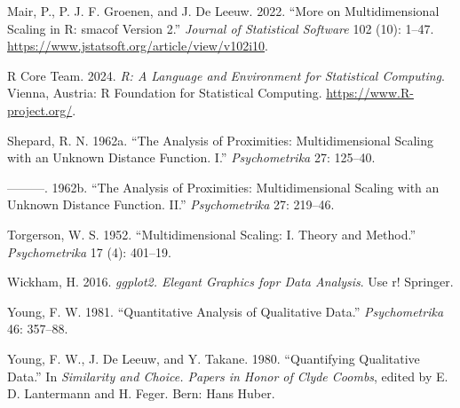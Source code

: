 \documentclass[
  12pt,
  letterpaper,
  DIV=11,
  numbers=noendperiod]{scrartcl}
\newlength{\cslhangindent}
\newenvironment{CSLReferences}[2] %
 {\begin{list}{}{%
  \setlength{\itemindent}{0pt}
  \setlength{\leftmargin}{0pt}
  \setlength{\parsep}{0pt}
  \ifodd #1
   \setlength{\leftmargin}{\cslhangindent}
   \setlength{\itemindent}{-1\cslhangindent}
  \fi
  \setlength{\itemsep}{#2\baselineskip}}}
 {\end{list}}
\theoremstyle{plain}
\theoremstyle{remark}
\begin{document}
\begin{CSLReferences}{1}{0}
Mair, P., P. J. F. Groenen, and J. De Leeuw. 2022. {``{More on
Multidimensional Scaling in R: smacof Version 2}.''} \emph{Journal of
Statistical Software} 102 (10): 1--47.
\url{https://www.jstatsoft.org/article/view/v102i10}.

R Core Team. 2024. \emph{R: A Language and Environment for Statistical
Computing}. {Vienna, Austria}: R Foundation for Statistical Computing.
\url{https://www.R-project.org/}.

Shepard, R. N. 1962a. {``{The Analysis of Proximities: Multidimensional
Scaling with an Unknown Distance Function. I}.''} \emph{Psychometrika}
27: 125--40.

---------. 1962b. {``{The Analysis of Proximities: Multidimensional
Scaling with an Unknown Distance Function. II}.''} \emph{Psychometrika}
27: 219--46.

Torgerson, W. S. 1952. {``{Multidimensional Scaling: I. Theory and
Method}.''} \emph{Psychometrika} 17 (4): 401--19.

Wickham, H. 2016. \emph{{ggplot2. Elegant Graphics fopr Data Analysis}}.
Use r! Springer.

Young, F. W. 1981. {``{Quantitative Analysis of Qualitative Data}.''}
\emph{Psychometrika} 46: 357--88.

Young, F. W., J. De Leeuw, and Y. Takane. 1980. {``Quantifying
Qualitative Data.''} In \emph{Similarity and Choice. Papers in Honor of
Clyde Coombs}, edited by E. D. Lantermann and H. Feger. Bern: Hans
Huber.

\end{CSLReferences}
\end{document}

